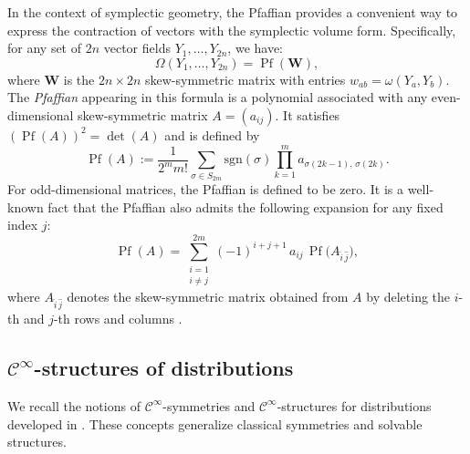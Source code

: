 \documentclass{article}
\theoremstyle{remark}
\theoremstyle{definition}
\newcommand{\cinf}{$\mathcal{C}^{\infty}$}
\begin{document}
In the context of symplectic geometry, the Pfaffian \cite{Bourbaki,Cayley,Vein} provides a convenient way to express the contraction of vectors with the symplectic volume form. Specifically, for any set of $2n$ vector fields $Y_1, \dots, Y_{2n}$, we have:
\begin{equation}\label{eq:pfaffianvol}
\Omega(Y_1,\dots,Y_{2n}) = \operatorname{Pf}(\mathbf{W}), 
\end{equation}
where $\mathbf{W}$ is the $2n \times 2n$ skew-symmetric matrix with entries $w_{ab} = \omega(Y_a, Y_b)$. The \emph{Pfaffian} appearing in this formula is a polynomial associated with any even-dimensional skew-symmetric matrix $A = (a_{ij})$. It satisfies $(\operatorname{Pf}(A))^2 = \det(A)$ and is defined by
\[
\operatorname{Pf}(A) := \frac{1}{2^m m!} \sum_{\sigma \in S_{2m}} \mathrm{sgn}(\sigma) \prod_{k=1}^m a_{\sigma(2k-1),\,\sigma(2k)}.
\]
For odd-dimensional matrices, the Pfaffian is defined to be zero. It is a well-known fact that the Pfaffian also admits the following expansion for any fixed index $j$:
\begin{equation}\label{pfaffianexpansion}
    \operatorname{Pf}(A) = \sum_{\substack{i=1 \\ i \neq j}}^{2m} (-1)^{i+j+1} \, a_{ij} \, \operatorname{Pf}\big(A_{\widehat{i}\,\widehat{j}}\big),
\end{equation}
where $A_{\widehat{i}\,\widehat{j}}$ denotes the skew-symmetric matrix obtained from $A$ by deleting the $i$-th and $j$-th rows and columns \cite{Gantmacher}.




\subsection{\texorpdfstring{\cinf}{cinf}-structures of distributions}\label{prelCinf-structures}

We recall the notions of \cinf-symmetries and \cinf-structures for distributions developed in \cite{pancinf-sym,pancinf-struct,pan23integration}. These concepts generalize classical symmetries and solvable structures.
\end{document}
